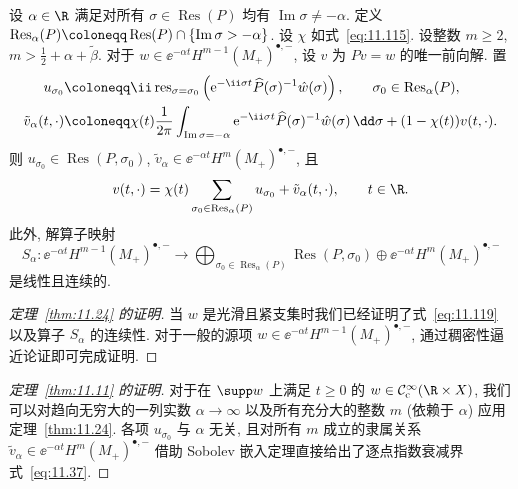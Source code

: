 \begin{theorem}\label{thm:11.24}
设 $\alpha \in \R$ 满足对所有 $\sigma \in \operatorname{Res}(P)$ 均有 $\operatorname{Im}\sigma \neq -\alpha$. 定义 $\operatorname{Res}_\alpha(P) \defeq \operatorname{Res}(P) \cap \{\operatorname{Im}\sigma > -\alpha\}$. 设 $\chi$ 如式~\eqref{eq:11.115}. 设整数 $m \ge 2$, $m > \frac{1}{2} + \alpha + \tilde\beta$. 对于 $w \in \ee^{-\alpha t} H^{m-1}(M_+)^{\bullet, -}$, 设 $v$ 为 $P v = w$ 的唯一前向解. 置
\begin{equation}\label{eq:11.118}
\begin{aligned}
    u_{\sigma_0} &\defeq \ii \operatorname{res}_{\sigma = \sigma_0}\left( \ee^{-\ii \sigma t} \widehat{P}(\sigma)^{-1} \hat w(\sigma) \right), \qquad \sigma_0 \in \operatorname{Res}_\alpha(P), \\
    \tilde v_\alpha(t, \cdot) &\defeq \chi(t) \frac{1}{2\pi} \int_{\operatorname{Im}\sigma = -\alpha} \ee^{-\ii \sigma t} \widehat{P}(\sigma)^{-1} \hat w(\sigma) \,\dd \sigma + (1 - \chi(t)) v(t, \cdot).
\end{aligned}
\end{equation}
则 $u_{\sigma_0} \in \operatorname{Res}(P, \sigma_0)$, $\tilde v_\alpha \in \ee^{-\alpha t} H^m(M_+)^{\bullet, -}$, 且
\begin{equation}\label{eq:11.119}
    v(t, \cdot) = \chi(t) \sum_{\sigma_0 \in \operatorname{Res}_\alpha(P)} u_{\sigma_0} + \tilde v_\alpha(t, \cdot), \qquad t \in \R.
\end{equation}
此外, 解算子映射
\begin{equation}\label{eq:11.120}
    S_\alpha \colon \ee^{-\alpha t} H^{m-1}(M_+)^{\bullet, -} \to \bigoplus_{\sigma_0 \in \operatorname{Res}_\alpha(P)} \operatorname{Res}(P, \sigma_0) \oplus \ee^{-\alpha t} H^m(M_+)^{\bullet, -}
\end{equation}
是线性且连续的.
\end{theorem}

\begin{proof}[定理~\ref{thm:11.24} 的证明]
当 $w$ 是光滑且紧支集时我们已经证明了式~\eqref{eq:11.119} 以及算子 $S_\alpha$ 的连续性. 对于一般的源项 $w \in \ee^{-\alpha t} H^{m-1}(M_+)^{\bullet, -}$, 通过稠密性逼近论证即可完成证明.
\end{proof}

\begin{proof}[定理~\ref{thm:11.11} 的证明]
对于在 $\supp w$ 上满足 $t \ge 0$ 的 $w \in \mathcal{C}_{\mathrm{c}}^\infty(\R \times X)$, 我们可以对趋向无穷大的一列实数 $\alpha \to \infty$ 以及所有充分大的整数 $m$ (依赖于 $\alpha$) 应用定理~\ref{thm:11.24}. 各项 $u_{\sigma_0}$ 与 $\alpha$ 无关, 且对所有 $m$ 成立的隶属关系 $\tilde v_\alpha \in \ee^{-\alpha t} H^m(M_+)^{\bullet, -}$ 借助 Sobolev 嵌入定理直接给出了逐点指数衰减界式~\eqref{eq:11.37}.
\end{proof}

